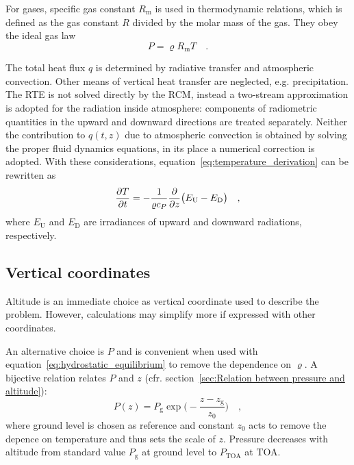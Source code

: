 \documentclass[a4paper,10pt,twocolumn,\classoptions]{article}
\newcommand{\PTOA}{P_\text{TOA}}
\begin{document}
For gases, specific gas constant $R_\text{m}$ is used in thermodynamic relations, which is defined as the gas constant $R$ divided by the molar mass of the gas.
They obey the ideal gas law
\begin{equation}
  \label{eq:ideal_gas_law}
  P = \varrho R_\text{m} T
  \quad .
\end{equation}

The total heat flux $q$ is determined by radiative transfer and atmospheric convection. Other means of vertical heat transfer are neglected, e.g. precipitation. The RTE is not solved directly by the RCM, instead a two-stream approximation is adopted for the radiation inside atmosphere: components of radiometric quantities in the upward and downward directions are treated separately. Neither the contribution to $q(t,z)$ due to atmospheric convection is obtained by solving the proper fluid dynamics equations, in its place a numerical correction is adopted.
With these considerations, equation~\eqref{eq:temperature_derivation} can be rewritten as
\begin{equation}
  \label{eq:temperature}
  \pdv{T}{t} = -\frac{1}{\varrho c_P} \pdv*{\big( E_\text{U} - E_\text{D} \big)}{z}
  \quad ,
\end{equation}
where $E_\text{U}$ and $E_\text{D}$ are irradiances of upward and downward radiations, respectively.



\subsection{Vertical coordinates}
\label{sec:Vertical coordinates}
Altitude is an immediate choice as vertical coordinate used to describe the problem. However, calculations may simplify more if expressed with other coordinates.

An alternative choice is $P$ and is convenient when used with equation~\eqref{eq:hydrostatic_equilibrium} to remove the dependence on $\varrho$. A bijective relation relates $P$ and $z$ (cfr. section~\ref{sec:Relation between pressure and altitude}):
\begin{equation}
  \label{eq:pressure_altitude}
  P(z) = P_\text{g} \exp{\bigg( - \frac{z - z_\text{g}}{z_0} \bigg)}
  \quad ,
\end{equation}
where ground level is chosen as reference and constant $z_0$ acts to remove the depence on temperature and thus sets the scale of $z$. Pressure decreases with altitude from standard value $P_\text{g}$ at ground level to $\PTOA$ at TOA.
\end{document}
